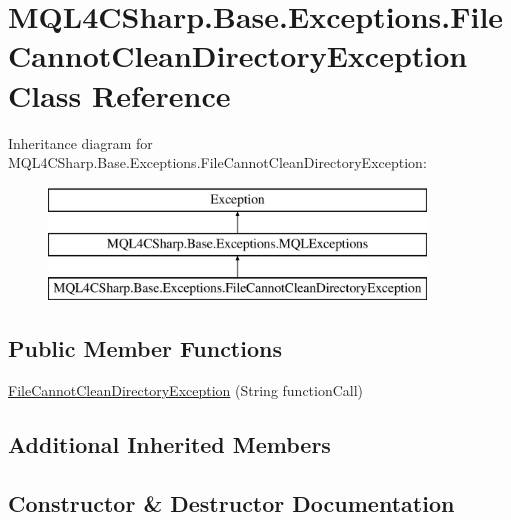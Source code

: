 \hypertarget{class_m_q_l4_c_sharp_1_1_base_1_1_exceptions_1_1_file_cannot_clean_directory_exception}{}\section{M\+Q\+L4\+C\+Sharp.\+Base.\+Exceptions.\+File\+Cannot\+Clean\+Directory\+Exception Class Reference}
\label{class_m_q_l4_c_sharp_1_1_base_1_1_exceptions_1_1_file_cannot_clean_directory_exception}
Inheritance diagram for M\+Q\+L4\+C\+Sharp.\+Base.\+Exceptions.\+File\+Cannot\+Clean\+Directory\+Exception\+:\begin{figure}[H]
\begin{center}
\leavevmode
\includegraphics[height=3.000000cm]{class_m_q_l4_c_sharp_1_1_base_1_1_exceptions_1_1_file_cannot_clean_directory_exception}
\end{center}
\end{figure}
\subsection*{Public Member Functions}
\begin{DoxyCompactItemize}
\item 
\hyperlink{class_m_q_l4_c_sharp_1_1_base_1_1_exceptions_1_1_file_cannot_clean_directory_exception_a40b51321fe2300130722896657faacda}{File\+Cannot\+Clean\+Directory\+Exception} (String function\+Call)
\end{DoxyCompactItemize}
\subsection*{Additional Inherited Members}


\subsection{Constructor \& Destructor Documentation}
